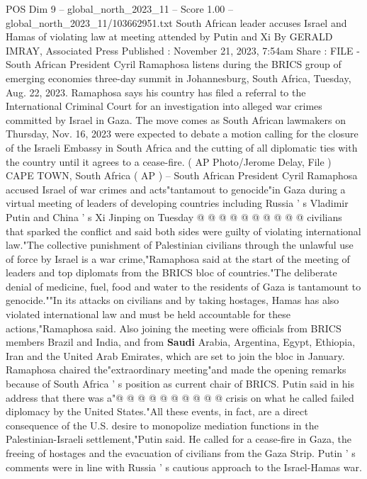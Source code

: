 \begin{textsample}{POS Dim 9 – global\_north\_2023\_11 – Score 1.00 – global\_north\_2023\_11/103662951.txt}  \label{ex:f9_pos_380}
South African leader accuses Israel and Hamas of violating law at meeting attended by Putin and Xi By GERALD IMRAY, Associated Press Published : November 21, 2023, 7:54am Share : FILE - South African President Cyril Ramaphosa listens during the BRICS group of emerging economies three-day summit in Johannesburg, South Africa, Tuesday, Aug. 22, 2023.
Ramaphosa says his country has filed a referral to the International Criminal Court for an investigation into alleged war crimes committed by Israel in Gaza.
The move comes as South African lawmakers on Thursday, Nov. 16, 2023 were expected to debate a motion calling for the closure of the Israeli Embassy in South Africa and the cutting of all diplomatic ties with the country until it agrees to a cease-fire. ( AP Photo/Jerome Delay, File ) CAPE TOWN, South Africa ( AP ) -- South African President Cyril Ramaphosa accused Israel of war crimes and acts"tantamout to genocide"in Gaza during a virtual meeting of leaders of developing countries including Russia ' s Vladimir Putin and China ' s Xi Jinping on Tuesday @ @ @ @ @ @ @ @ @ @ civilians that sparked the conflict and said both sides were guilty of violating international law."The collective punishment of Palestinian civilians through the unlawful use of force by Israel is a war crime,"Ramaphosa said at the start of the meeting of leaders and top diplomats from the BRICS bloc of countries."The deliberate denial of medicine, fuel, food and water to the residents of Gaza is tantamount to genocide.""In its attacks on civilians and by taking hostages, Hamas has also violated international law and must be held accountable for these actions,"Ramaphosa said.
Also joining the meeting were officials from BRICS members Brazil and India, and from \textbf{Saudi} Arabia, Argentina, Egypt, Ethiopia, Iran and the United Arab Emirates, which are set to join the bloc in January.
Ramaphosa chaired the"extraordinary meeting"and made the opening remarks because of South Africa ' s position as current chair of BRICS.
Putin said in his address that there was a"@ @ @ @ @ @ @ @ @ @ crisis on what he called failed diplomacy by the United States."All these events, in fact, are a direct consequence of the U.S. desire to monopolize mediation functions in the Palestinian-Israeli settlement,"Putin said.
He called for a cease-fire in Gaza, the freeing of hostages and the evacuation of civilians from the Gaza Strip.
Putin ' s comments were in line with Russia ' s cautious approach to the Israel-Hamas war.

\end{textsample}

